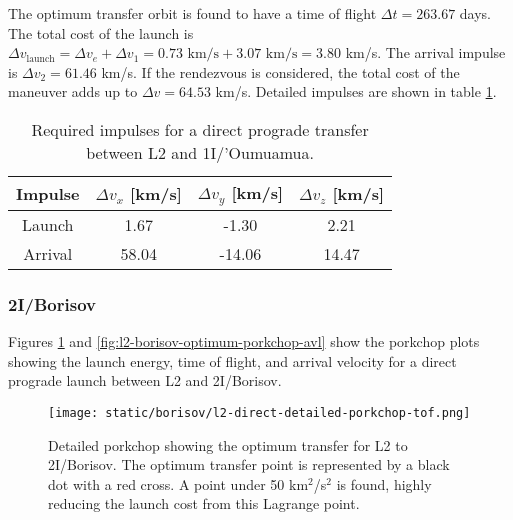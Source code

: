 The optimum transfer orbit is found to have a time of flight $\Delta t = 263.67$
days. The total cost of the launch is $\Delta v_\text{launch} = \Delta v_e +
  \Delta v_1 = 0.73 \text{ km/s} + 3.07 \text{ km/s} = 3.80$ km/s. The arrival
impulse is $\Delta v_2 = 61.46$ km/s. If the rendezvous is considered, the total
cost of the maneuver adds up to $\Delta v = 64.53$ km/s. Detailed impulses are
shown in table \ref{tab:l2-oumuamua-direct-transfer-impulses}.

\vspace{1cm}
\begin{table}[H]
  \centering
  \begin{tabular}{|c|c|c|c|}
    \hline
    Impulse & $\Delta v_x$ [km/s] & $\Delta v_y$ [km/s] & $\Delta v_z$ [km/s] \\
    \hline
    Launch  & 1.67                & -1.30               & 2.21                \\
    \hline
    Arrival & 58.04               & -14.06              & 14.47               \\
    \hline
  \end{tabular}
  \caption[Required impulses for a direct prograde transfer between L2 and
    1I/'Oumuamua]{Required impulses for a direct prograde transfer between L2 and
    1I/'Oumuamua.}
  \label{tab:l2-oumuamua-direct-transfer-impulses}
\end{table}


\subsubsection{2I/Borisov}

Figures \ref{fig:l2-borisov-optimum-porkchop} and
\ref{fig:l2-borisov-optimum-porkchop-avl} show the porkchop plots showing the
launch energy, time of flight, and arrival velocity for a direct prograde launch
between L2 and 2I/Borisov.

\begin{figure}[H]
  \centering
  \texttt{[image: static/borisov/l2-direct-detailed-porkchop-tof.png]}
  \caption[Detailed porkchop showing the optimum transfer for
    L2 to 2I/Borisov with the time of flight.]{Detailed porkchop showing the optimum transfer for
    L2 to 2I/Borisov. The optimum transfer point is represented by a black dot
    with a red cross.
    A point under 50 km$^2$/s$^2$ is found, highly
    reducing the launch cost from this Lagrange point.
  }
  \label{fig:l2-borisov-optimum-porkchop}
\end{figure}

